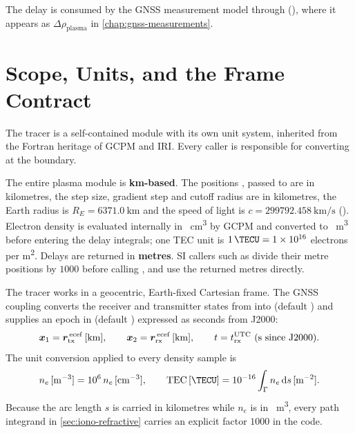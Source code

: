 The delay is consumed by the GNSS measurement model through
(), where it appears as
$\Delta\rho_\mathrm{plasma}$ in \cref{chap:gnss-measurements}.

\section{Scope, Units, and the Frame Contract}
\label{sec:iono-contract}

The tracer is a self-contained module with its own unit system, inherited from
the Fortran heritage of GCPM and IRI.  Every caller is responsible for
converting at the boundary.

\begin{lupntnote}
The entire plasma module is \textbf{km-based}.  The positions ,
 passed to  are in kilometres, the step size, gradient
step and cutoff radius are in kilometres, the Earth radius is
$R_E = \SI{6371.0}{\kilo\meter}$ and the speed of light is
$c = \SI{299792.458}{\kilo\meter\per\second}$
().  Electron density is
evaluated internally in \si{\per\cubic\centi\meter} by GCPM and converted to
\si{\per\cubic\meter} before entering the delay integrals; one TEC unit is
$\SI{1}{\TECU} = \num{1e16}$ electrons per \si{\square\meter}.  Delays are
returned in \textbf{metres}.  SI callers such as  divide
their metre positions by $1000$ before calling , and use the
returned metres directly.
\end{lupntnote}

The tracer works in a geocentric, Earth-fixed Cartesian frame.  The GNSS
coupling converts the receiver and transmitter states from 
into  (default ) and supplies an epoch in
 (default ) expressed as seconds
from J2000:
%
\begin{equation}
  \label{eq:iono-inputs}
  \bm{x}_1 = \bm{r}_\mathrm{tx}^{\,\mathrm{ecef}}\,[\si{\kilo\meter}],
  \qquad
  \bm{x}_2 = \bm{r}_\mathrm{rx}^{\,\mathrm{ecef}}\,[\si{\kilo\meter}],
  \qquad
  t = t_\mathrm{rx}^{\mathrm{UTC}}\ \text{(s since J2000)} .
\end{equation}
%
The unit conversion applied to every density sample is
%
\begin{equation}
  \label{eq:iono-ne-units}
  n_e\,[\si{\per\cubic\meter}] = 10^{6}\, n_e\,[\si{\per\cubic\centi\meter}] ,
  \qquad
  \mathrm{TEC}\,[\si{\TECU}] = 10^{-16} \int_\Gamma n_e\,\dd s\,[\si{\per\square\meter}] .
\end{equation}
%
Because the arc length $s$ is carried in kilometres while $n_e$ is in
\si{\per\cubic\meter}, every path integrand in \cref{sec:iono-refractive}
carries an explicit factor $1000$ in the code.

